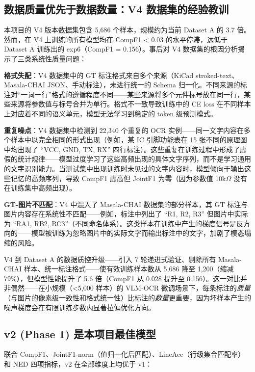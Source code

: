 \subsection{数据质量优先于数据数量：V4 数据集的经验教训}

本项目的 V4 版本数据集包含 5,686 个样本，规模约为当前 Dataset A 的 3.7 倍。然而，在 V4 上训练的所有模型均在 CompF1 < 0.03 的水平停滞，远低于 Dataset A 训练出的 exp6（CompF1 = 0.156）。事后对 V4 数据集的根因分析揭示了三类系统性质量问题：

\textbf{格式失配}：V4 数据集中的 GT 标注格式来自多个来源（KiCad stroked-text、Masala-CHAI JSON、手动标注），未进行统一的 Schema 归一化。不同来源的标注对``一词一行''格式的遵循程度不同——某些来源将多个元件标号放在同一行，某些来源将参数值与标号合并为单行。格式不一致导致训练中的 CE loss 在不同样本上对应着不同的语义单元，模型无法学习到稳定的 token 级预测模式。

\textbf{重复噪点}：V4 数据集中检测到 22,340 个重复的 OCR 实例——同一文字内容在多个样本中以完全相同的形式出现（例如，某 IC 引脚功能表在 15 张不同的原理图中均出现了 ``VCC, GND, TX, RX'' 四行标注）。这些重复在训练过程中形成了虚假的统计规律——模型过度学习了这些高频出现的具体文字序列，而不是学习通用的文字识别能力。当测试集中出现训练时未见过的文字内容时，模型倾向于输出这些记忆的高频序列，导致 CompF1 虚高但 JointF1 为零（因为参数值 10k$\Omega$ 没有在训练集中高频出现）。

\textbf{GT-图片不匹配}：V4 中混入了 Masala-CHAI 数据集的部分样本，其 GT 标注与图片内容存在系统性不匹配——例如，标注中列出了 ``R1, R2, R3'' 但图片中实际为 ``RA1, RB2, RC3''（不同命名体系）。这类样本在训练中产生的梯度信号是反方向的——模型被训练为忽略图片中的实际文字而输出标注中的文字，加剧了模态塌缩的风险。

V4 到 Dataset A 的数据质控升级——引入 7 轮递进式验证、剔除所有 Masala-CHAI 样本、统一标注格式——使有效训练样本数从 5,686 降至 1,200（缩减 79\%），但模型性能提升了 5.6 倍（CompF1 从 0.028 提升至 0.156）。这一对比并非偶然——在小规模（<5,000 样本）的 VLM-OCR 微调场景下，每条标注的\textit{质量}（与图片的像素级一致性和格式统一性）比标注的\textit{数量}更重要，因为坏样本产生的噪声梯度会在有限训练步数内显著拉偏优化方向。

\subsection{v2 (Phase 1) 是本项目最佳模型}

联合 CompF1、JointF1-norm（值归一化后匹配）、LineAcc（行级集合匹配率）和 NED 四项指标，v2 在全部维度上均优于 v1：

